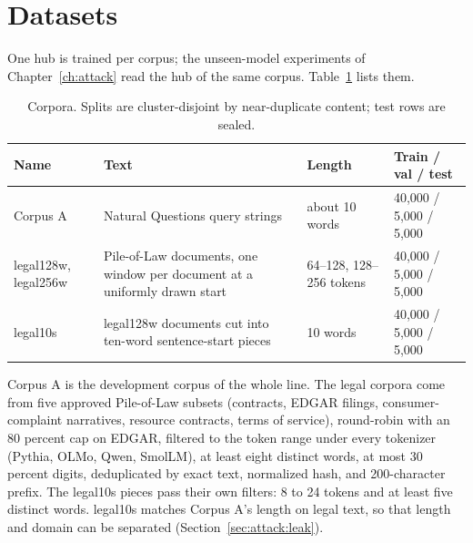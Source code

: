 \section{Datasets}\label{sec:hub:corpora}

One hub is trained per corpus; the unseen-model experiments of Chapter~\ref{ch:attack} read the hub of the same corpus. Table~\ref{tab:hub:corpora} lists them.

\begin{table}[H]
\caption{Corpora. Splits are cluster-disjoint by near-duplicate content; test rows are sealed.}
\label{tab:hub:corpora}
\centering
\begin{tabular}{llll}
\toprule
Name & Text & Length & Train / val / test \\
\midrule
Corpus A & Natural Questions query strings & about 10 words & 40{,}000 / 5{,}000 / 5{,}000 \\
legal128w, legal256w & Pile-of-Law documents, one window per document at a uniformly drawn start & 64--128, 128--256 tokens & 40{,}000 / 5{,}000 / 5{,}000 \\
legal10s & legal128w documents cut into ten-word sentence-start pieces & 10 words & 40{,}000 / 5{,}000 / 5{,}000 \\
\bottomrule
\end{tabular}
\end{table}

Corpus A is the development corpus of the whole line. The legal corpora come from five approved Pile-of-Law subsets (contracts, EDGAR filings, consumer-complaint narratives, resource contracts, terms of service), round-robin with an 80 percent cap on EDGAR, filtered to the token range under every tokenizer (Pythia, OLMo, Qwen, SmolLM), at least eight distinct words, at most 30 percent digits, deduplicated by exact text, normalized hash, and 200-character prefix. The legal10s pieces pass their own filters: 8 to 24 tokens and at least five distinct words. legal10s matches Corpus A's length on legal text, so that length and domain can be separated (Section~\ref{sec:attack:leak}).
